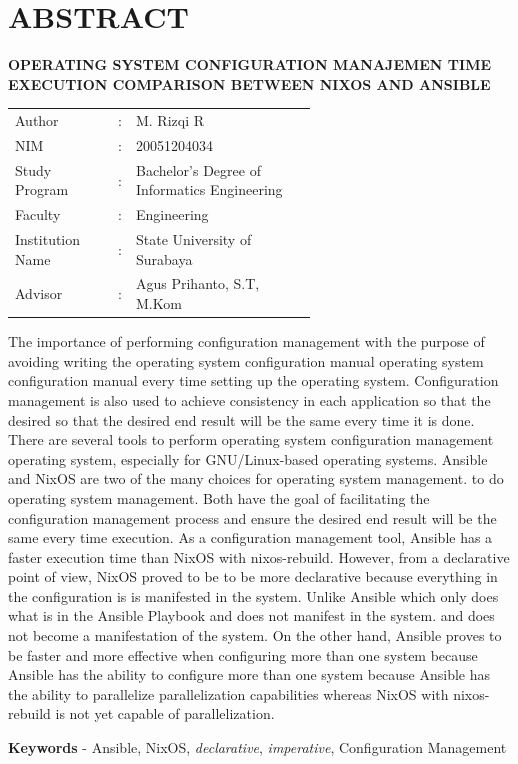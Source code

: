 \documentclass[10pt,]{report}
\begin{document}
\chapter*{ABSTRACT}
\begin{adjustwidth}{0.0cm}{}
	\begin{center}
		\textbf{OPERATING SYSTEM CONFIGURATION MANAJEMEN TIME EXECUTION COMPARISON BETWEEN NIXOS AND ANSIBLE}
	\end{center}
	\medskip
	\begin{adjustwidth}{0.0cm}{}
		\begin{tabular}{@{}lcp{0.6\linewidth}}
			Author           & : & M. Rizqi R                                   \\
			NIM              & : & 20051204034                                  \\
			Study Program    & : & Bachelor's Degree of Informatics Engineering \\
			Faculty          & : & Engineering                                  \\
			Institution Name & : & State University of Surabaya                 \\
			Advisor          & : & Agus Prihanto, S.T, M.Kom                    \\
		\end{tabular}
	\end{adjustwidth}
	\medskip

	The importance of performing configuration management with the purpose of
	avoiding writing the operating system configuration manual operating system
	configuration manual every time setting up the operating system.
	Configuration management is also used to achieve consistency in each
	application so that the desired so that the desired end result will be the
	same every time it is done. There are several tools to perform operating
	system configuration management operating system, especially for
	GNU/Linux-based operating systems. Ansible and NixOS are two of the many
	choices for operating system management. to do operating system management.
	Both have the goal of facilitating the configuration management process and
	ensure the desired end result will be the same every time execution. As a
	configuration management tool, Ansible has a faster execution time than NixOS
	with nixos-rebuild. However, from a declarative point of view, NixOS proved
	to be to be more declarative because everything in the configuration is is
	manifested in the system. Unlike Ansible which only does what is in the
	Ansible Playbook and does not manifest in the system. and does not become a
	manifestation of the system. On the other hand, Ansible proves to be faster
	and more effective when configuring more than one system because Ansible has
	the ability to configure more than one system because Ansible has the ability
	to parallelize parallelization capabilities whereas NixOS with nixos-rebuild
	is not yet capable of parallelization.

	\medskip

	\noindent\textbf{Keywords} - Ansible, NixOS, \textit{declarative}, \textit{imperative},
	Configuration Management
\end{adjustwidth}
\end{document}
